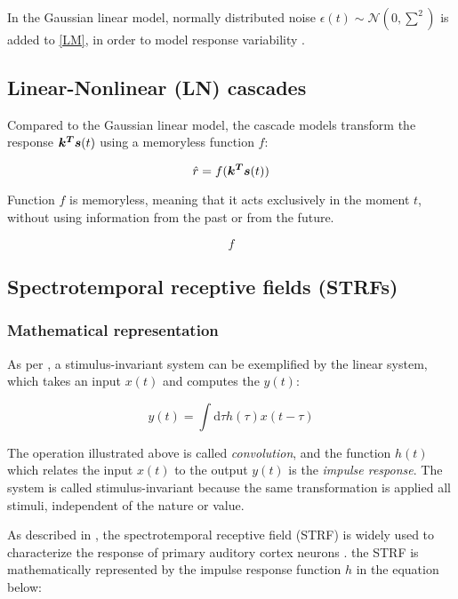 In the Gaussian linear model, normally distributed noise $\epsilon(t) \sim \mathcal{N}(0, \sum^2)$ is added to \eqref{LM}, in order to model response variability \parencite{meyerModelsNeuronalStimulusResponse2017}.

\subsection{Linear-Nonlinear (LN) cascades}

Compared to the Gaussian linear model, the cascade models transform the response $\bm{k^T}\bm{s}(t)$ using a memoryless function $f$:

\begin{equation}
	\hat{r} = f(\bm{k^T}\bm{s}(t))
\end{equation}

Function $f$ is memoryless, meaning that it acts exclusively in the moment $t$, without using information from the past or from the future.

\begin{equation}
	f
\end{equation}

\subsection{Spectrotemporal receptive fields (STRFs)}

\subsubsection{Mathematical representation}

As per \textcite{aertsenSpectroTemporalReceptiveField1981}, a stimulus-invariant system can be exemplified by the linear system, which takes an input $x(t)$ and computes the $y(t)$:

\begin{equation}
	y(t) = \int \mathrm{d}\tau h(\tau) x(t - \tau)
\end{equation}

The operation illustrated above is called \emph{convolution}, and the function $h(t)$ which relates the input $x(t)$ to the output $y(t)$ is the \emph{impulse response}. The system is called stimulus-invariant because the same transformation is applied all stimuli, independent of the nature or value.

As described in \textcite{aertsenSpectrotemporalReceptiveFields1980}, the spectrotemporal receptive field (STRF) is widely used to characterize the response of primary auditory cortex neurons \parencite{ahrensNonlinearitiesContextualInfluences2008}. the STRF is mathematically represented by the impulse response function $h$ in the equation below:


